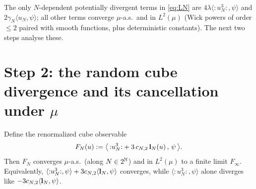\medskip
The only $N$-dependent potentially divergent terms in \eqref{eq:LN} are
$4\lambda\langle{:}u_N^3{:},\psi\rangle$ and $2\gamma_N\langle u_N,\psi\rangle$; all
other terms converge $\mu$-a.s.\ and in $L^2(\mu)$ (Wick powers of order $\le2$ paired
with smooth functions, plus deterministic constants). The next two steps analyse these.

\section*{Step 2: the random cube divergence and its cancellation under $\mu$}

\begin{qonelemma}\label{lem:cancel}
Define the renormalized cube observable
\begin{equation}\label{eq:FN}
F_N(u):=\bigl\langle\,{:}u_N^3{:}+3\,c_{N,2}\,\mathbf{l}_N(u)\,,\,\psi\,\bigr\rangle .
\end{equation}
Then $F_N$ converges $\mu$-a.s.\ (along $N\in2^{\mathbb{N}}$) and in $L^2(\mu)$ to a finite
limit $F_\infty$. Equivalently, $\langle{:}u_N^3{:},\psi\rangle+3c_{N,2}\langle\mathbf{l}_N,\psi\rangle$
converges, while $\langle{:}u_N^3{:},\psi\rangle$ alone diverges like
$-3c_{N,2}\langle\mathbf{l}_N,\psi\rangle$.
\end{qonelemma}
